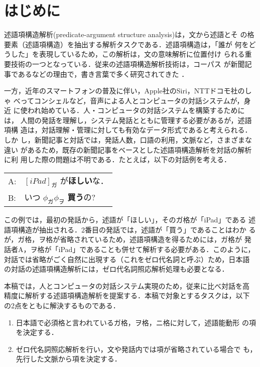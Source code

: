 \documentclass[japanese]{jnlp_1.4}
\begin{document}
\maketitle

\section{はじめに}

述語項構造解析(predicate-argument structure analysis)は，文から述語とそ
の格要素（述語項構造）を抽出する解析タスクである．述語項構造は，「誰が
何をどうした」を表現しているため，この解析は，文の意味解析に位置付け
られる重要技術の一つとなっている．従来の述語項構造解析技術は，コーパス
が新聞記事であるなどの理由で，書き言葉で多く研究されてきた
\cite{carreras-marquez:2004:CONLL,carreras-marquez:2005:CoNLL,Matsubayashi:PredArgsData2014j}
．

一方，近年のスマートフォンの普及に伴い，Apple社のSiri，NTTドコモ社のしゃ
べってコンシェルなど，音声による人とコンピュータの対話システムが，身近
に使われ始めている．人・コンピュータの対話システムを構築するためには，
人間の発話を理解し，システム発話とともに管理する必要があるが，述語項構
造は，対話理解・管理に対しても有効なデータ形式であると考えられる．しか
し，新聞記事と対話では，発話人数，口語の利用，文脈など，さまざまな違い
があるため，既存の新聞記事をベースとした述語項構造解析を対話の解析に利
用した際の問題は不明である．たとえば，以下の対話例を考える．

\vspace{1\Cvs}
\begin{center}
\begin{tabular}{|lp{60mm}|}
\hline
A: & $\left[\mathit{iPad}\right]_{\text{ガ}}$ が\textbf{ほしい}な． \\
B: & いつ $\phi_{\text{ガ}} \phi_{\text{ヲ}}$ \textbf{買う}の?\\
\hline
\end{tabular}
\end{center}
\vspace{1\Cvs}

\noindent
この例では，最初の発話から，述語が「ほしい」，そのガ格が「iPad」である
述語項構造が抽出される．2番目の発話では，述語が「買う」であることはわか
るが，ガ格，ヲ格が省略されているため，述語項構造を得るためには，ガ格が
発話者A，ヲ格が「iPad」であることも併せて解析する必要がある．このように，
対話では省略がごく自然に出現する（これをゼロ代名詞と呼ぶ）ため，日本語
の対話の述語項構造解析には，ゼロ代名詞照応解析処理も必要となる．

本稿では，人とコンピュータの対話システム実現のため，従来に比べ対話を高
精度に解析する述語項構造解析を提案する．本稿で対象とするタスクは，以下
の2点をともに解決するものである．
\begin{enumerate}
\item 日本語で必須格と言われているガ格，ヲ格，ニ格に対して，述語能動形
の項を決定する．
\item ゼロ代名詞照応解析を行い，文や発話内では項が省略されている場合で
も，先行した文脈から項を決定する．
\end{enumerate}
\end{document}
